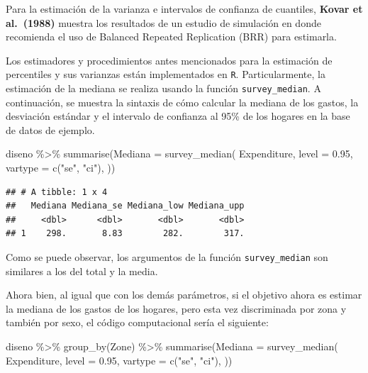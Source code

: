 \documentclass[
  12pt,
]{book}
\newenvironment{Shaded}{\begin{snugshade}}{\end{snugshade}}
\newcommand{\AttributeTok}[1]{\textcolor[rgb]{0.77,0.63,0.00}{#1}}
\newcommand{\FloatTok}[1]{\textcolor[rgb]{0.00,0.00,0.81}{#1}}
\newcommand{\FunctionTok}[1]{\textcolor[rgb]{0.00,0.00,0.00}{#1}}
\newcommand{\NormalTok}[1]{#1}
\newcommand{\SpecialCharTok}[1]{\textcolor[rgb]{0.00,0.00,0.00}{#1}}
\newcommand{\StringTok}[1]{\textcolor[rgb]{0.31,0.60,0.02}{#1}}
\begin{document}
Para la estimación de la varianza e intervalos de confianza de cuantiles, \textbf{Kovar et al.~(1988)} muestra los resultados de un estudio de simulación en donde recomienda el uso de Balanced Repeated Replication (BRR) para estimarla.

Los estimadores y procedimientos antes mencionados para la estimación de percentiles y sus varianzas están implementados en \texttt{R}. Particularmente, la estimación de la mediana se realiza usando la función \texttt{survey\_median}. A continuación, se muestra la sintaxis de cómo calcular la mediana de los gastos, la desviación estándar y el intervalo de confianza al 95\% de los hogares en la base de datos de ejemplo.

\begin{Shaded}
\begin{Highlighting}[]
\NormalTok{diseno }\SpecialCharTok{\%\textgreater{}\%} \FunctionTok{summarise}\NormalTok{(}\AttributeTok{Mediana =} 
  \FunctionTok{survey\_median}\NormalTok{(}
\NormalTok{    Expenditure,}
    \AttributeTok{level =} \FloatTok{0.95}\NormalTok{,}
    \AttributeTok{vartype =}  \FunctionTok{c}\NormalTok{(}\StringTok{"se"}\NormalTok{, }\StringTok{"ci"}\NormalTok{),}
\NormalTok{   ))}
\end{Highlighting}
\end{Shaded}

\begin{verbatim}
## # A tibble: 1 x 4
##   Mediana Mediana_se Mediana_low Mediana_upp
##     <dbl>      <dbl>       <dbl>       <dbl>
## 1    298.       8.83        282.        317.
\end{verbatim}

Como se puede observar, los argumentos de la función \texttt{survey\_median} son similares a los del total y la media.

Ahora bien, al igual que con los demás parámetros, si el objetivo ahora es estimar la mediana de los gastos de los hogares, pero esta vez discriminada por zona y también por sexo, el código computacional sería el siguiente:

\begin{Shaded}
\begin{Highlighting}[]
\NormalTok{diseno }\SpecialCharTok{\%\textgreater{}\%} \FunctionTok{group\_by}\NormalTok{(Zone) }\SpecialCharTok{\%\textgreater{}\%} 
  \FunctionTok{summarise}\NormalTok{(}\AttributeTok{Mediana =} 
  \FunctionTok{survey\_median}\NormalTok{(}
\NormalTok{    Expenditure,}
    \AttributeTok{level =} \FloatTok{0.95}\NormalTok{,}
    \AttributeTok{vartype =}  \FunctionTok{c}\NormalTok{(}\StringTok{"se"}\NormalTok{, }\StringTok{"ci"}\NormalTok{),}
\NormalTok{   ))}
\end{Highlighting}
\end{Shaded}
\end{document}
